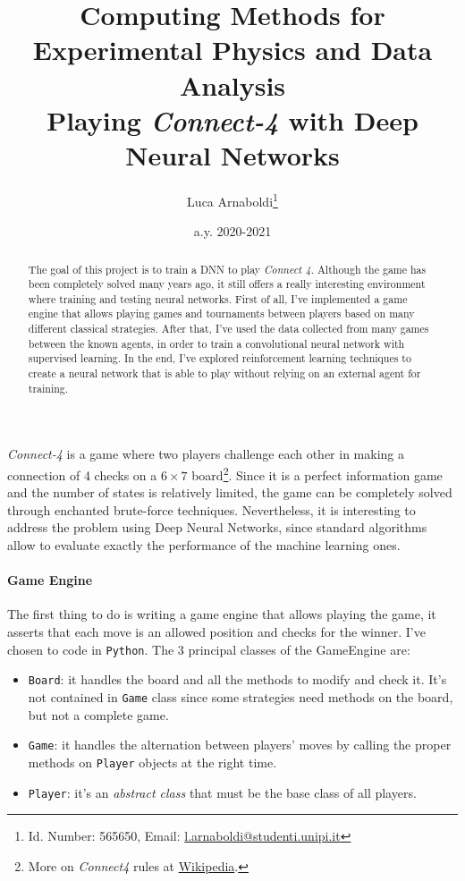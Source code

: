 \documentclass{article}
\title{
  {\normalsize Computing Methods for Experimental Physics and Data Analysis}\\
  Playing \emph{Connect-4} with Deep Neural Networks
}
\author{Luca Arnaboldi\footnote{Id. Number: 565650, Email: \href{mailto:l.arnaboldi@studenti.unipi.it}{l.arnaboldi@studenti.unipi.it}}}
\date{a.y. 2020-2021}
\newcommand{\ipy}[1]{\texttt{#1}}
\begin{document}
  \maketitle
  \begin{abstract}
    The goal of this project is to train a DNN to play \emph{Connect 4}. Although the game has been completely solved many years ago, it still offers a really interesting environment where training and testing neural networks. First of all, I've implemented a game engine that allows playing games and tournaments between players based on many different classical strategies. After that, I've used the data collected from many games between the known agents, in order to train a convolutional neural network with supervised learning. In the end, I've explored reinforcement learning techniques to create a neural network that is able to play without relying on an external agent for training. 
  \end{abstract}
  
  \emph{Connect-4} is a game where two players challenge each other in making a connection of 4 checks on a \(6\times7\) board\footnote{More on \emph{Connect4} rules at \href{https://en.wikipedia.org/wiki/Connect_Four}{Wikipedia}.}. 
  Since it is a perfect information game and the number of states is relatively limited, the game can be completely solved through enchanted brute-force techniques. Nevertheless, it is interesting to address the problem using Deep Neural Networks, since standard algorithms allow to evaluate exactly the performance of the machine learning ones.
  
  \paragraph{Game Engine}
  The first thing to do is writing a game engine that allows playing the game, it asserts that each move is an allowed position and checks for the winner. I've chosen to code in \texttt{Python}. The 3 principal classes of the GameEngine are:
  \begin{itemize}
    \item \ipy{Board}: it handles the board and all the methods to modify and check it. It's not contained in \ipy{Game} class since some strategies need methods on the board, but not a complete game. 
    \item \ipy{Game}: it handles the alternation between players' moves by calling the proper methods on \ipy{Player} objects at the right time. 
    \item \ipy{Player}: it's an \emph{abstract class} that must be the base class of all players.
  \end{itemize}
\end{document}
